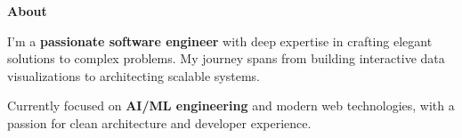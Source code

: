 \begin{tcolorbox}[vercelcard]
\textcolor{DockerBlue}{\large\textbf{About}}

\vspace{8pt}

I'm a \textbf{passionate software engineer} with deep expertise in crafting elegant solutions to complex problems. My journey spans from building interactive data visualizations to architecting scalable systems.

\vspace{6pt}

Currently focused on \textcolor{DockerBlue}{\textbf{AI/ML engineering}} and modern web technologies, with a passion for clean architecture and developer experience.

\end{tcolorbox}